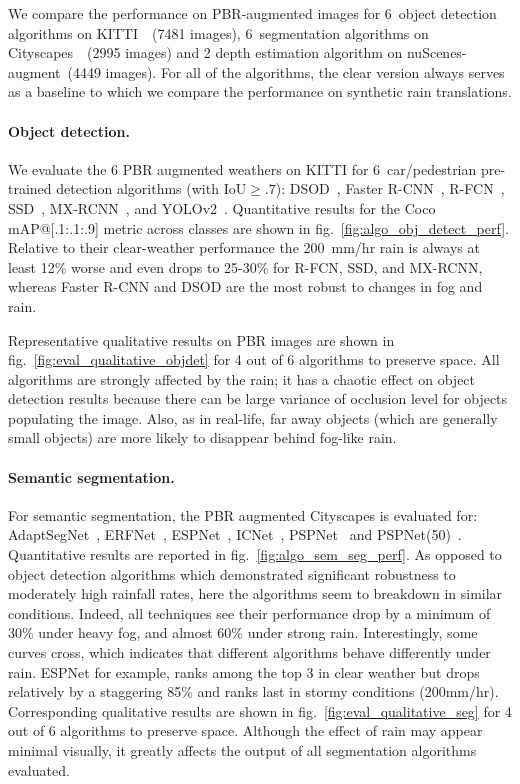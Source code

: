 We compare the performance on PBR-augmented images for 6~object detection algorithms on KITTI~\cite{Geiger2012CVPR}~(7481 images), 6~segmentation algorithms on Cityscapes~\cite{Cordts2016Cityscapes}~(2995 images) and 2 depth estimation algorithm on nuScenes-augment~(4449 images). 
For all of the algorithms, the clear version always serves as a baseline to which we compare the performance on synthetic rain translations.

\paragraph{Object detection.}
We evaluate the 6 PBR augmented weathers on KITTI for 6~car/pedestrian pre-trained detection algorithms (with $\text{IoU}\geq.7$): DSOD~\cite{Shen2017DSOD}, Faster R-CNN~\cite{ren2015faster}, R-FCN~\cite{dai2016r}, SSD~\cite{liu2016ssd}, MX-RCNN~\cite{yang2016exploit}, and YOLOv2~\cite{redmon2017yolo9000}. Quantitative results for the Coco mAP@[.1:.1:.9] metric across classes are shown in fig.~\ref{fig:algo_obj_detect_perf}. Relative to their clear-weather performance the 200~mm/hr rain is always at least 12\% worse and even drops to 25-30\% for R-FCN, SSD, and MX-RCNN, whereas Faster R-CNN and DSOD are the most robust to changes in fog and rain. 

Representative qualitative results on PBR images are shown in fig.~\ref{fig:eval_qualitative_objdet} for 4 out of 6 algorithms to preserve space. All algorithms are strongly affected by the rain; it has a chaotic effect on object detection results because there can be large variance of occlusion level for objects populating the image. Also, as in real-life, far away objects (which are generally small objects) are more likely to disappear behind fog-like rain. 

\paragraph{Semantic segmentation.}
For semantic segmentation, the PBR augmented Cityscapes is evaluated for: AdaptSegNet~\cite{Tsai_adaptseg_2018}, ERFNet~\cite{romera2018erfnet}, ESPNet~\cite{mehta2018espnet}, ICNet~\cite{zhao2018icnet}, PSPNet~\cite{zhao2017pspnet} and PSPNet(50)~\cite{zhao2017pspnet}.
Quantitative results are reported in fig.~\ref{fig:algo_sem_seg_perf}. As opposed to object detection algorithms which demonstrated significant robustness to moderately high rainfall rates, here the algorithms seem to breakdown in similar conditions. Indeed, all techniques see their performance drop by a minimum of 30\% under heavy fog, and almost 60\% under strong rain. Interestingly, some curves cross, which indicates that different algorithms behave differently under rain. ESPNet for example, ranks among the top 3 in clear weather but drops relatively by a staggering 85\% and ranks last in stormy conditions (200mm/hr). Corresponding qualitative results are shown in fig.~\ref{fig:eval_qualitative_seg} for 4 out of 6 algorithms to preserve space. Although the effect of rain may appear minimal visually, it greatly affects the output of all segmentation algorithms evaluated. 

